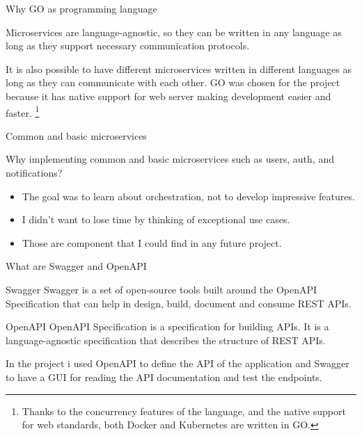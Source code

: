 \documentclass{beamer}
\begin{document}
\begin{frame}{Why GO as programming language}
	\label{golang}
	\begin{block}{}
		Microservices are language-agnostic, so they can be written in any language as long as they support necessary communication protocols.
		\end{block}
		It is also possible to have different microservices written in different languages as long as they can communicate with each other.
		\newline \newline \newline
		GO was chosen for the project because it has native support for web server making development easier and faster.  \footnote{Thanks to the concurrency features of the language, and the native support for web standards, both Docker and Kubernetes are written in GO.}
\newline
\hyperlink{index_1}{}
\end{frame}

\begin{frame}{Common and basic microservices}
	\label{common_ms}
	\begin{block}{}
		Why implementing common and basic microservices such as users, auth, and notifications?
	\end{block}
	\begin{itemize}
		\item The goal was to learn about orchestration, not to develop impressive features.
		\item I didn't want to lose time by thinking of exceptional use cases.
		\item Those are component that I could find in any future project.
	\end{itemize}
\hyperlink{index_1}{}
\end{frame}

\begin{frame}{What are Swagger and OpenAPI}
	\label{swagger_openapi}
	\begin{block}{Swagger}
		Swagger is a set of open-source tools built around the OpenAPI Specification that can help in design, build, document and consume REST APIs.
\end{block}
\begin{block}{OpenAPI}
		OpenAPI Specification is a specification for building APIs. It is a language-agnostic specification that describes the structure of REST APIs.
\end{block}
In the project i used OpenAPI to define the API of the application and Swagger to have a GUI for reading the API documentation and test the endpoints.
\newline
\hyperlink{index_1}{}
\end{frame}
\end{document}
